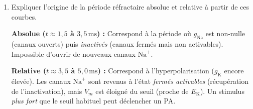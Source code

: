 \documentclass[11pt]{article}
\begin{document}
\begin{exercice}
\begin{enumerate}
\item Expliquer l'origine de la période réfractaire absolue et relative à partir de ces courbes.
\par \textbf{Absolue ($t \approx 1,5$ à $3,5\,\text{ms}$) :} Correspond à la période où $g_{\text{Na}}$ est non-nulle (canaux ouverts) puis \emph{inactivés} (canaux fermés mais non activables). Impossible d'ouvrir de nouveaux canaux $\text{Na}^+$.
\par \textbf{Relative ($t \approx 3,5$ à $5,0\,\text{ms}$) :} Correspond à l'hyperpolarisation ($g_{\text{K}}$ encore élevée). Les canaux $\text{Na}^+$ sont revenus à l'état \emph{fermés activables} (récupération de l'inactivation), mais $V_m$ est éloigné du seuil (proche de $E_{\text{K}}$). Un stimulus \emph{plus fort} que le seuil habituel peut déclencher un PA.
\end{enumerate}
\end{exercice}
\end{document}
